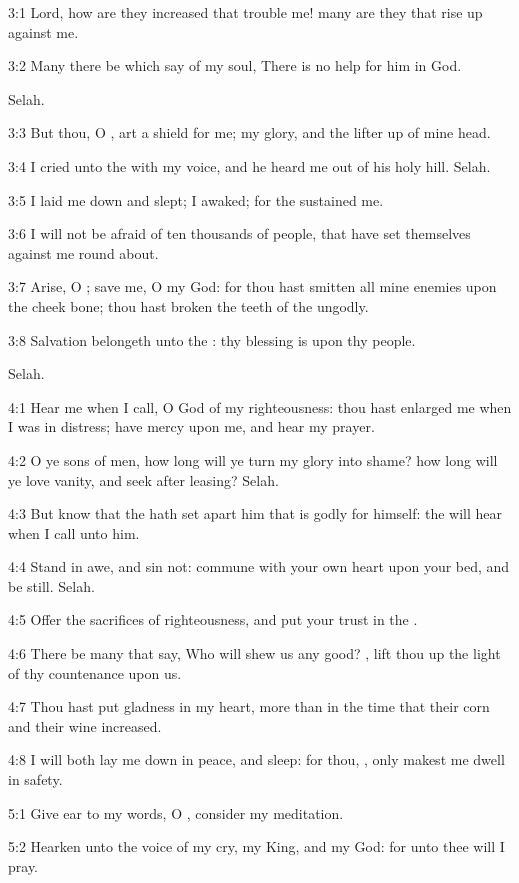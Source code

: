 3:1 Lord, how are they increased that trouble me! many are they that rise up against me.

3:2 Many there be which say of my soul, There is no help for him in God.

Selah.

3:3 But thou, O \LORD, art a shield for me; my glory, and the lifter up of mine head.

3:4 I cried unto the \LORD with my voice, and he heard me out of his holy hill. Selah.

3:5 I laid me down and slept; I awaked; for the \LORD sustained me.

3:6 I will not be afraid of ten thousands of people, that have set themselves against me round about.

3:7 Arise, O \LORD; save me, O my God: for thou hast smitten all mine enemies upon the cheek bone; thou hast broken the teeth of the ungodly.

3:8 Salvation belongeth unto the \LORD: thy blessing is upon thy people.

Selah.



4:1 Hear me when I call, O God of my righteousness: thou hast enlarged me when I was in distress; have mercy upon me, and hear my prayer.

4:2 O ye sons of men, how long will ye turn my glory into shame? how long will ye love vanity, and seek after leasing? Selah.

4:3 But know that the \LORD hath set apart him that is godly for himself: the \LORD will hear when I call unto him.

4:4 Stand in awe, and sin not: commune with your own heart upon your bed, and be still. Selah.

4:5 Offer the sacrifices of righteousness, and put your trust in the \LORD.

4:6 There be many that say, Who will shew us any good? \LORD, lift thou up the light of thy countenance upon us.

4:7 Thou hast put gladness in my heart, more than in the time that their corn and their wine increased.

4:8 I will both lay me down in peace, and sleep: for thou, \LORD, only makest me dwell in safety.



5:1 Give ear to my words, O \LORD, consider my meditation.

5:2 Hearken unto the voice of my cry, my King, and my God: for unto thee will I pray.

